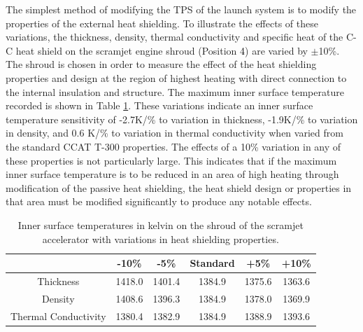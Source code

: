 The simplest method of modifying the TPS of the launch system is to modify the properties of the external heat shielding. 
To illustrate the effects of these variations, the thickness, density, thermal conductivity and specific heat of the C-C heat shield on the scramjet engine shroud (Position \textcolor{black}{4}) are varied by $\pm$10\%. The shroud is chosen in order to measure the effect of the heat shielding properties and design at the region of highest heating with direct connection to the internal insulation and structure. The maximum inner surface temperature recorded is shown in Table \ref{tab:tpsscramjet}. These variations indicate an inner surface temperature sensitivity of -2.7K/\% to variation in thickness, -1.9K/\% to variation in density, and 0.6 K/\% to variation in thermal conductivity when varied from the standard CCAT T-300 properties. 
The effects of a 10\% variation in any of these properties is not particularly large. This indicates that if the maximum inner surface temperature is to be reduced in an area of high heating through modification of the passive heat shielding, the heat shield design or properties in that area must be modified significantly to produce any notable effects. 
\begin{table}[ht]
	\centering
	\begin{tabular}{|c|c|c|c|c|c|}
		\hline  & -10\% & -5\% & Standard & +5\% & +10\% \\ 
		\hline Thickness & 1418.0 & 1401.4 & 1384.9  &   1375.6&   1363.6\\ 
		\hline Density & 1408.6 &  1396.3  & 1384.9 &  1378.0&  1369.9\\ 
		\hline Thermal Conductivity &  1380.4 & 1382.9 & 1384.9 &  1388.9& 1393.6\\ 
		\hline 
	\end{tabular}
	
	\caption{Inner surface temperatures in kelvin on the shroud of the scramjet accelerator with variations in heat shielding properties.}
	\label{tab:tpsscramjet}
\end{table}

